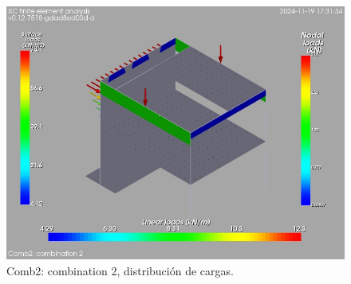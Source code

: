 \begin{figure}[ht]
\begin{center}
\includegraphics[width=\linewidth]{results/graphics/loads/LS2overallSet}
\caption{Comb2: combination 2, distribución de cargas.}
\label{LS2overallSet}
\end{center}
\end{figure}
